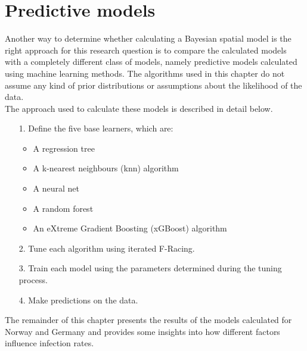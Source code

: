 \section{Predictive models}\label{sec:predictive}
Another way to determine whether calculating a Bayesian spatial model is the right approach for this research question is to compare the calculated models with a completely different class of models, namely predictive models calculated using machine learning methods. The algorithms used in this chapter do not assume any kind of prior distributions or assumptions about the likelihood of the data.\\
The approach used to calculate these models is described in detail below.
\begin{itemize}
    \item[1.] Define the five base learners, which are:
    \begin{itemize}
        \item A regression tree
        \item A k-nearest neighbours (knn) algorithm
        \item A neural net
        \item A random forest
        \item An eXtreme Gradient Boosting (xGBoost) algorithm
    \end{itemize}
    \item[2.] Tune each algorithm using iterated F-Racing.
    \item[3.] Train each model using the parameters determined during the tuning process.
    \item[4.] Make predictions on the data.
\end{itemize}
The remainder of this chapter presents the results of the models calculated for Norway and Germany and provides some insights into how different factors influence infection rates.
